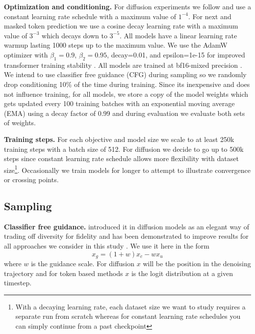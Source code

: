 \textbf{Optimization and conditioning.} For diffusion experiments we follow \cite{esser2024scaling} and use a constant learning rate schedule with a maximum value of $1^{-4}$. For next and masked token prediction we use a cosine decay learning rate with a maximum value of $3^{-3}$ which decays down to $3^{-5}$. All models have a linear learning rate warmup lasting 1000 steps up to the maximum value. We use the AdamW \citep{loshchilov2019decoupled} optimizer with $\beta_1 =0.9$, $\beta_2 = 0.95$, decay=0.01, and epsilon=1e-15 for improved transformer training stability \citep{wortsman2023smallscale}. All models are trained at bf16-mixed precision \citep{bfloat16}. We intend to use classifier free guidance (CFG) \citep{ho2022classifierfree} during sampling so we randomly drop conditioning 10\% of the time during training. Since its inexpensive and does not influence training, for all models, we store a copy of the model weights which gets updated every 100 training batches with an exponential moving average (EMA) using a decay factor of 0.99 and during evaluation we evaluate both sets of weights. 

\textbf{Training steps.} For each objective and model size we scale to at least 250k training steps with a batch size of 512. For diffusion we decide to go up to 500k steps since constant learning rate schedule allows more flexibility with dataset size\footnote{With a decaying learning rate, each dataset size we want to study requires a separate run from scratch whereas for constant learning rate schedules you can simply continue from a past checkpoint}. Occasionally we train models for longer to attempt to illustrate convergence or crossing points.

\subsection{Sampling}
\textbf{Classifier free guidance.} \cite{ho2022classifierfree} introduced it in diffusion models as an elegant way of trading off diversity for fidelity and has been demonstrated to improve results for all approaches we consider in this study \citep{chang2023muse, gafni2022makeascene, ho2022classifierfree}. We use it here in the form 
\begin{equation}
x_g = (1 + w)x_c - wx_u
\end{equation}
where $w$ is the guidance scale. For diffusion $x$ will be the position in the denoising trajectory and for token based methods $x$ is the logit distribution at a given timestep.

